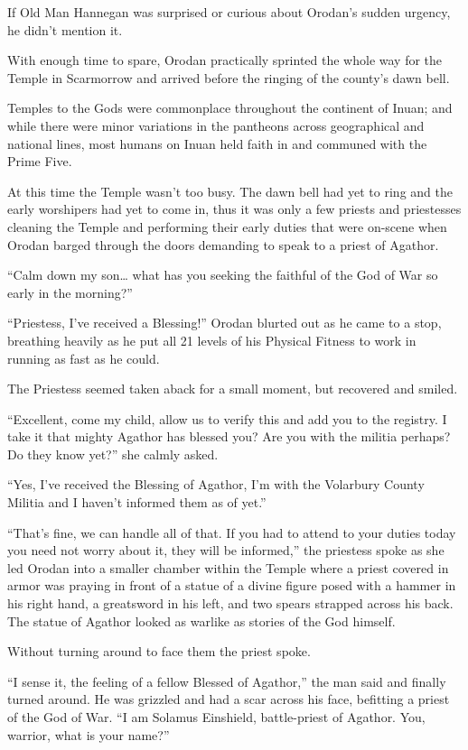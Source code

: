 \documentclass[a4paper,10pt]{book}
\begin{document}
If Old Man Hannegan was surprised or curious about Orodan’s sudden urgency, he didn’t mention it.\par
With enough time to spare, Orodan practically sprinted the whole way for the Temple in Scarmorrow and arrived before the ringing of the county’s dawn bell.\par
Temples to the Gods were commonplace throughout the continent of Inuan; and while there were minor variations in the pantheons across geographical and national lines, most humans on Inuan held faith in and communed with the Prime Five.\par
At this time the Temple wasn’t too busy. The dawn bell had yet to ring and the early worshipers had yet to come in, thus it was only a few priests and priestesses cleaning the Temple and performing their early duties that were on-scene when Orodan barged through the doors demanding to speak to a priest of Agathor.\par
“Calm down my son… what has you seeking the faithful of the God of War so early in the morning?”\par
“Priestess, I’ve received a Blessing!” Orodan blurted out as he came to a stop, breathing heavily as he put all 21 levels of his Physical Fitness to work in running as fast as he could.\par
The Priestess seemed taken aback for a small moment, but recovered and smiled.\par
“Excellent, come my child, allow us to verify this and add you to the registry. I take it that mighty Agathor has blessed you? Are you with the militia perhaps? Do they know yet?” she calmly asked.\par
“Yes, I’ve received the Blessing of Agathor, I’m with the Volarbury County Militia and I haven’t informed them as of yet.”\par
“That’s fine, we can handle all of that. If you had to attend to your duties today you need not worry about it, they will be informed,” the priestess spoke as she led Orodan into a smaller chamber within the Temple where a priest covered in armor was praying in front of a statue of a divine figure posed with a hammer in his right hand, a greatsword in his left, and two spears strapped across his back. The statue of Agathor looked as warlike as stories of the God himself.\par
Without turning around to face them the priest spoke.\par
“I sense it, the feeling of a fellow Blessed of Agathor,” the man said and finally turned around. He was grizzled and had a scar across his face, befitting a priest of the God of War. “I am Solamus Einshield, battle-priest of Agathor. You, warrior, what is your name?”\par
\end{document}
